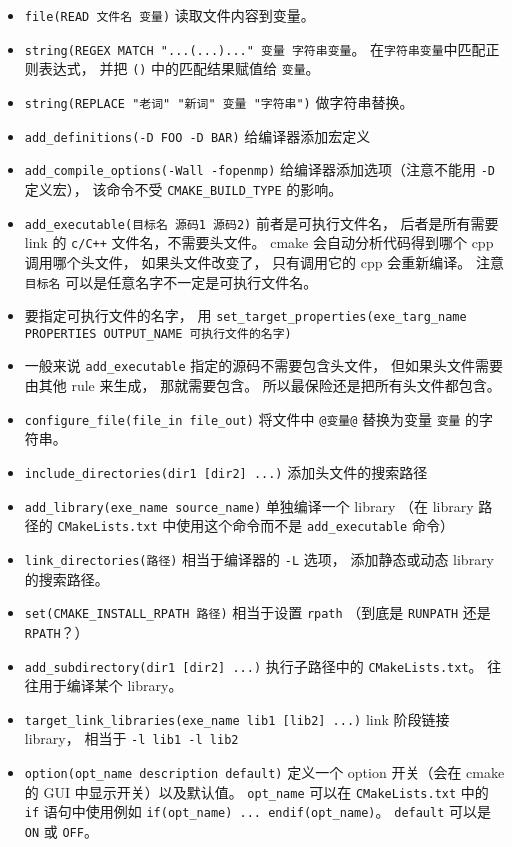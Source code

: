 \begin{itemize}
\item \verb|file(READ 文件名 变量)| 读取文件内容到变量。
\item \verb|string(REGEX MATCH "...(...)..." 变量 字符串变量|。 在\verb|字符串变量|中匹配正则表达式， 并把 \verb|()| 中的匹配结果赋值给 \verb|变量|。
\item \verb|string(REPLACE "老词" "新词" 变量 "字符串")| 做字符串替换。
\item \verb|add_definitions(-D FOO -D BAR)| 给编译器添加宏定义
\item \verb|add_compile_options(-Wall -fopenmp)| 给编译器添加选项（注意不能用 \verb|-D| 定义宏）， 该命令不受 \verb|CMAKE_BUILD_TYPE| 的影响。
\item \verb`add_executable(目标名 源码1 源码2)` 前者是可执行文件名， 后者是所有需要 link 的 \verb|c/C++| 文件名，不需要头文件。 cmake 会自动分析代码得到哪个 cpp 调用哪个头文件， 如果头文件改变了， 只有调用它的 cpp 会重新编译。 注意 \verb|目标名| 可以是任意名字不一定是可执行文件名。
\item 要指定可执行文件的名字， 用 \verb|set_target_properties(exe_targ_name PROPERTIES OUTPUT_NAME 可执行文件的名字)|
\item 一般来说 \verb|add_executable| 指定的源码不需要包含头文件， 但如果头文件需要由其他 rule 来生成， 那就需要包含。 所以最保险还是把所有头文件都包含。
\item \verb`configure_file(file_in file_out)` 将文件中 \verb`@变量@` 替换为变量 \verb`变量` 的字符串。
\item \verb`include_directories(dir1 [dir2] ...)` 添加头文件的搜索路径
\item \verb`add_library(exe_name source_name)` 单独编译一个 library （在 library 路径的 \verb|CMakeLists.txt| 中使用这个命令而不是 \verb`add_executable` 命令）
\item \verb|link_directories(路径)| 相当于编译器的 \verb`-L` 选项， 添加静态或动态 library 的搜索路径。
\item \verb|set(CMAKE_INSTALL_RPATH 路径)| 相当于设置 \verb|rpath| （到底是 \verb|RUNPATH| 还是 \verb|RPATH|？）
\item \verb`add_subdirectory(dir1 [dir2] ...)` 执行子路径中的 \verb|CMakeLists.txt|。 往往用于编译某个 library。
\item \verb`target_link_libraries(exe_name lib1 [lib2] ...)` link 阶段链接 library， 相当于 \verb|-l lib1 -l lib2|
\item \verb`option(opt_name description default)` 定义一个 option 开关（会在 cmake 的 GUI 中显示开关）以及默认值。 \verb`opt_name` 可以在 \verb|CMakeLists.txt| 中的 \verb`if` 语句中使用例如 \verb`if(opt_name) ... endif(opt_name)`。 \verb`default` 可以是 \verb`ON` 或 \verb`OFF`。

\end{itemize}
